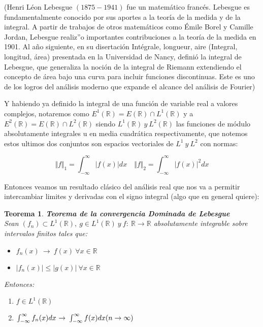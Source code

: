 \documentclass[a4paper,spanish]{article}
\def\R {\mathbb{R}}
\newtheorem{teo}[prop]{Teorema}
\numberwithin{equation}{section}
\begin{document}
(Henri L\'eon Lebesgue $(1875 - 1941)$ fue un matem\'atico franc\'es. Lebesgue es fundamentalmente conocido por sus aportes a la teor\'ia de la medida y de la integral. A partir de trabajos de otros matem\'aticos como \'Emile Borel y Camille Jordan, Lebesgue realiz''o importantes contribuciones a la teor\'ia de la medida en 1901. Al a\~no siguiente, en su disertaci\'on Int\'egrale, longueur, aire (Integral, longitud, \'area) presentada en la Universidad de Nancy, defini\'o la integral de Lebesgue, que generaliza la noci\'on de la integral de Riemann extendiendo el concepto de \'area bajo una curva para incluir funciones discontinuas. Este es uno de los logros del an\'alisis moderno que expande el alcance del an\'alisis de Fourier)

Y habiendo ya definido la integral de una funci\'on de variable real a valores complejos, notaremos como $E^1 \left({\R}\right) = E \left({\R}\right) \cap L^1 \left({\R}\right)$ y a $E^2 \left({\R}\right) = E \left({\R}\right) \cap L^2 \left({\R}\right)$ siendo $L^1\left({\R}\right) \ y \ L^2\left({\R}\right)$ las funciones de m\'odulo absolutamente integrales u en media cuadr\'atica respectivamente, que notemos estos ultimos dos conjuntos son espacios vectoriales de $L^1\ y \ L^2$ con normas:

\[\Vert{f}\Vert_1= \int_{-\infty}^{\infty}{\vert{f(x)}\vert} dx \quad \Vert{f}\Vert_2=\int_{-\infty}^{\infty}{\vert{f(x)}\vert}^2 dx \]
 
Entonces veamos un resultado cl\'asico del an\'alisis real que nos va a permitir intercambiar limites y derivadas con el signo integral (algo que en general quiere):

\begin{teo}\textbf{Teorema de la convergencia Dominada de Lebesgue}\\
Sean $(f_n)\subset L^1(\R), \ g \in L^1(\R) \ y \ f: \ \R \rightarrow \R$ absolutamente integrable sobre intervalos finitos tales que:
\begin{itemize}
\item $f_n(x) \ \rightarrow \ f(x) \ \forall x \in \R $
\item $\vert{f_n(x)}\vert \leq \vert{g(x)}\vert \ \forall x \in \R$
\end{itemize}
Entonces:
\begin{enumerate}
\item $f\in L^1(\R)$
\item $\int_{-\infty}^{\infty}{f_n(x)} dx \ {\rightarrow} \ \int_{-\infty}^{\infty}{f(x)} dx \\ (n \rightarrow \infty) $
\end{enumerate}
\end{teo}
\end{document}
